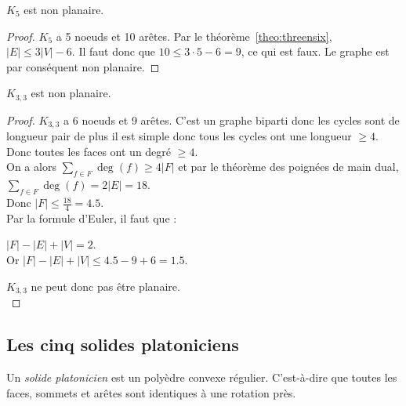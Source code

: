 \begin{mycorr}
  $K_5$ est non planaire.
  \begin{proof}
    $K_5$ a 5 noeuds et 10 arêtes.
    Par le théorème~\ref{theo:threensix}, $|E| \leq 3|V| - 6$.
    Il faut donc que $10 \leq 3 \cdot 5 - 6 = 9$, ce qui est faux.
    Le graphe est par conséquent non planaire.
  \end{proof}
\end{mycorr}

\begin{mycorr}
  $K_{3,3}$ est non planaire.
  \begin{proof}
    $K_{3,3}$ a 6 noeuds et 9 arêtes.
    C'est un graphe biparti donc les cycles sont de longueur pair de plus il est simple donc tous les cycles ont une longueur $\geq 4$.\\
    Donc toutes les faces ont un degré $\geq 4$.\\
    On a alors $\sum_{f \in F} \deg(f) \geq 4|F|$ et par le théorème des poignées de main dual, $\sum_{f \in F} \deg(f) = 2|E| = 18$.\\
    Donc $|F| \leq \frac{18}{4} = 4.5$.\\
    \noindent
    Par la formule d'Euler, il faut que :
    \begin{center}
      $|F| - |E| + |V| = 2$.\\
      Or $|F| - |E| + |V| \leq 4.5 - 9 + 6 = 1.5$.\\
    \end{center}
    $K_{3,3}$ ne peut donc pas être planaire.\\
  \end{proof}
\end{mycorr}

\subsection{Les cinq solides platoniciens}
\begin{mydef}
  Un \emph{solide platonicien} est un polyèdre convexe régulier.
  C'est-à-dire que toutes les faces, sommets et arêtes sont identiques à une rotation près.
\end{mydef}

